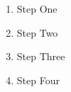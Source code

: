 \begin{enumerate}

\item Step One

\item Step Two

\item Step Three

\item Step Four

\end{enumerate}